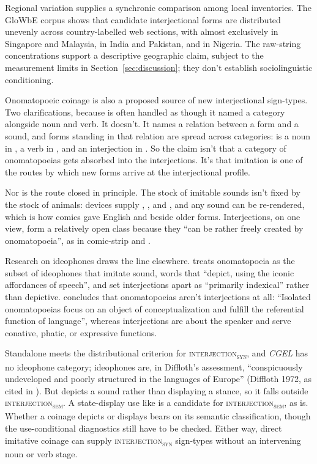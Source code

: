 \documentclass[12pt]{article}
\newcommand{\intj}[1]{\textsc{interjection\textsubscript{#1}}}
\begin{document}
Regional variation supplies a synchronic comparison among local inventories.
The GloWbE corpus \citep[1.9~billion words across 20 English-speaking
countries]{daviesfuchs2015} shows that candidate interjectional forms
are distributed unevenly across country-labelled web sections, with  almost
exclusively in Singapore and Malaysia,  in India and
Pakistan, and  in Nigeria. The raw-string concentrations
support a descriptive geographic claim, subject to the measurement limits in
Section~\ref{sec:discussion}; they don't establish sociolinguistic
conditioning.

Onomatopoeic coinage is also a proposed source of new interjectional
sign-types. Two
clarifications, because  is often handled as though it
named a category alongside noun and verb. It doesn't. It names a relation
between a form and a sound, and forms standing in that relation are spread
across categories:  is a noun in , a
verb in , and an interjection in
. So the claim isn't that a category of
onomatopoeias gets absorbed into the interjections. It's that imitation is
one of the routes by which new forms arrive at the interjectional profile.

Nor is the route closed in principle. The stock of imitable sounds isn't fixed by the
stock of animals: devices supply , , and
, and any sound can be re-rendered, which is how comics gave
English  and  beside older forms. Interjections,
on one view, form a relatively open class because they \enquote{can be
rather freely created by onomatopoeia}, as in comic-strip 
and  \citep[74]{quirk1985}.

Research on ideophones draws the line elsewhere.
\textcite[3, 19]{dingemanse2018} treats onomatopoeia as the subset of
ideophones that imitate sound, words that \enquote{depict, using the iconic
affordances of speech}, and \textcite[529]{dingemanseakita2017} set
interjections apart as \enquote{primarily indexical} rather than depictive.
\textcite[150, 167]{meinard2015} concludes that onomatopoeias aren't
interjections at all: \enquote{Isolated onomatopoeias focus on an object of
conceptualization and fulfill the referential function of language}, whereas
interjections are about the speaker and serve conative, phatic, or expressive
functions.

Standalone  meets the distributional criterion for
\intj{syn}, and \textit{CGEL} has no ideophone category; ideophones are, in
Diffloth's assessment, \enquote{conspicuously undeveloped and poorly
structured in the languages of Europe} (Diffloth 1972, as cited in
\citealp[12]{dingemanse2018}). But  depicts a sound rather
than displaying a stance, so it falls outside \intj{sem}. A state-display use
like  is a candidate for \intj{sem}, as  is.
Whether a coinage depicts or displays bears on its semantic classification,
though the use-conditional diagnostics still have to be checked. Either way,
direct imitative coinage can supply \intj{syn} sign-types without an
intervening noun or verb stage.
\end{document}
